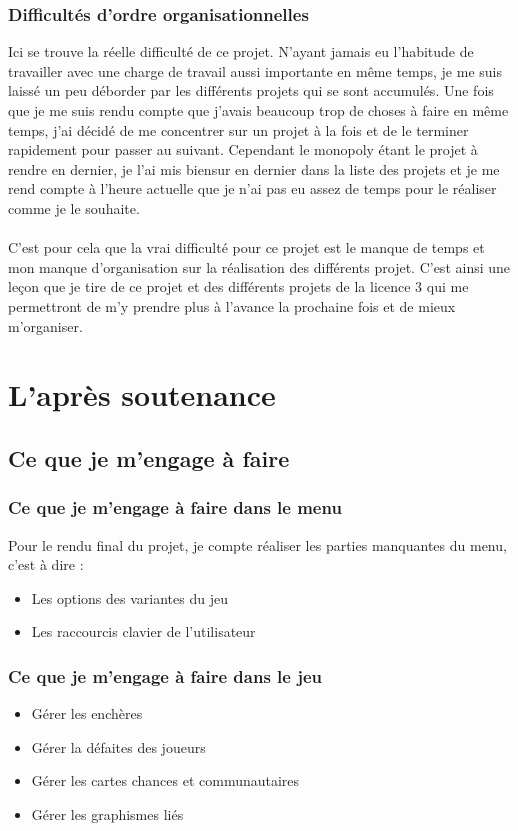 \documentclass[12pt, openany]{report}
\begin{document}
    \section{Difficultés d'ordre organisationnelles}
      Ici se trouve la réelle difficulté de ce projet. N'ayant jamais eu l'habitude de travailler avec une charge de travail aussi importante en même temps, je me suis laissé un peu déborder par les différents projets qui se sont accumulés. Une fois que je me suis rendu compte que j'avais beaucoup trop de choses à faire en même temps, j'ai décidé de me concentrer sur un projet à la fois et de le terminer rapidement pour passer au suivant. Cependant le monopoly étant le projet à rendre en dernier, je l'ai mis biensur en dernier dans la liste des projets et je me rend compte à l'heure actuelle que je n'ai pas eu assez de temps pour le réaliser comme je le souhaite.\\\\
      C'est pour cela que la vrai difficulté pour ce projet est le manque de temps et mon manque d'organisation sur la réalisation des différents projet. C'est ainsi une leçon que je tire de ce projet et des différents projets de la licence 3 qui me permettront de m'y prendre plus à l'avance la prochaine fois et de mieux m'organiser.

\part{L'après soutenance}
  \chapter{Ce que je m'engage à faire}
    \section{Ce que je m'engage à faire dans le menu}
      Pour le rendu final du projet, je compte réaliser les parties manquantes du menu, c'est à dire :
      \begin{itemize}
        \item Les options des variantes du jeu
        \item Les raccourcis clavier de l'utilisateur
      \end{itemize}  

    \section{Ce que je m'engage à faire dans le jeu}
      \begin{itemize}
        \item Gérer les enchères
        \item Gérer la défaites des joueurs
        \item Gérer les cartes chances et communautaires
        \item Gérer les graphismes liés
      \end{itemize}
\end{document}
